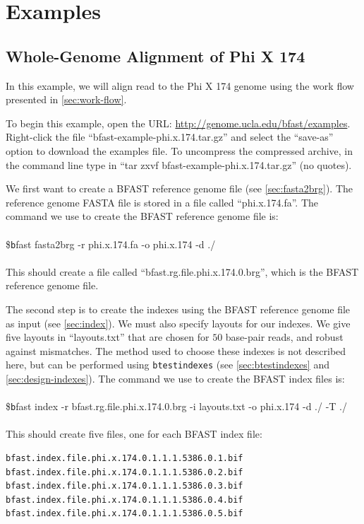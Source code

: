 \documentclass[a4paper,12pt]{book}
\newcommand{\TT}[1]{{\tt #1}} %
\newenvironment{script}{\\\\\footnotesize\$\TT}{\normalsize\\\\}
\newcommand{\rGFF}{reference genome FASTA file}
\newcommand{\BRGF}{BFAST reference genome file} %
\newcommand{\BIF}{BFAST index file} %
\begin{document}
\chapter{Examples}
\section{Whole-Genome Alignment of Phi X 174}
\label{sec:phi}
In this example, we will align read to the Phi X 174 genome using the work flow presented in \autoref{sec:work-flow}.

To begin this example, open the URL: \url{http://genome.ucla.edu/bfast/examples}.
Right-click the file ``bfast-example-phi.x.174.tar.gz'' and select the ``save-as'' option to download the examples file.
To uncompress the compressed archive, in the command line type in ``tar zxvf bfast-example-phi.x.174.tar.gz'' (no quotes).

We first want to create a \BRGF{} (see \autoref{sec:fasta2brg}).
The \rGFF{} is stored in a file called ``phi.x.174.fa''.
The command we use to create the \BRGF{} is:
\begin{script}
	bfast fasta2brg -r phi.x.174.fa -o phi.x.174 -d ./
\end{script}
This should create a file called ``bfast.rg.file.phi.x.174.0.brg'', which is the \BRGF{}.

The second step is to create the indexes using the \BRGF{} as input (see \autoref{sec:index}).
We must also specify layouts for our indexes.
We give five layouts in ``layouts.txt'' that are chosen for $50$ base-pair reads, and robust against mismatches.
The method used to choose these indexes is not described here, but can be performed using \TT{btestindexes} (see \autoref{sec:btestindexes} and \autoref{sec:design-indexes}).
The command we use to create the \BIF{s} is:
\begin{script}
	bfast index -r bfast.rg.file.phi.x.174.0.brg -i layouts.txt -o phi.x.174 -d ./ -T ./
\end{script}
This should create five files, one for each \BIF{}:
\begin{verbatim}
bfast.index.file.phi.x.174.0.1.1.1.5386.0.1.bif
bfast.index.file.phi.x.174.0.1.1.1.5386.0.2.bif
bfast.index.file.phi.x.174.0.1.1.1.5386.0.3.bif
bfast.index.file.phi.x.174.0.1.1.1.5386.0.4.bif
bfast.index.file.phi.x.174.0.1.1.1.5386.0.5.bif
\end{verbatim}
\end{document}
